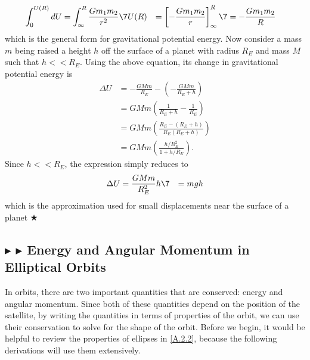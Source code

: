 \begin{align}
    \int_0^{U(R)} dU &= \int_{\infty}^R \frac{Gm_1m_2}{r^2} \7
    U(R) &= \left[-\frac{Gm_1m_2}{r}\right]_{\infty}^{R} \7
    &= -\frac{Gm_1m_2}{R}
\end{align}
\noindent which is the general form for gravitational potential energy. Now consider a mass $m$ being raised a height $h$ off the surface of a planet with radius $R_E$ and mass $M$ such that $h << R_E$. Using the above equation, its change in gravitational potential energy is 
\begin{align*}
    \Delta U &= -\frac{GMm}{R_E} - \left(-\frac{GMm}{R_E+h}\right) \\
    &= GMm\left(\frac{1}{R_E + h} - \frac{1}{R_E}\right) \\
    &= GMm\left(\frac{R_E - (R_E + h)}{R_E(R_E + h)}\right) \\
    &= GMm\left(\frac{h/R_E^2}{1+ h/R_E}\right).
\end{align*}
\noindent Since $h<<R_E$, the expression simply reduces to
\begin{align}
    \Delta U &= \frac{GMm}{R_E^2}h \7
    &= mgh
\end{align}
\noindent which is the approximation used for small displacements near the surface of a planet $\bigstar$

%
%
\subsection{\color{Goldenrod} $\blacktriangleright$ \color{Orchid} $\blacktriangleright$ \color{black} Energy and Angular Momentum in Elliptical Orbits}
In orbits, there are two important quantities that are conserved: energy and angular momentum. Since both of these quantities depend on the position of the satellite, by writing the quantities in terms of properties of the orbit, we can use their conservation to solve for the shape of the orbit. Before we begin, it would be helpful to review the properties of ellipses in \ref{A.2.2}, because the following derivations will use them extensively.

